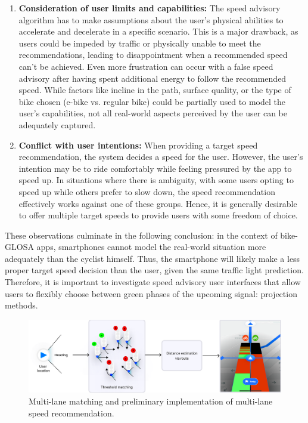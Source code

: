 \begin{enumerate}
\item \textbf{Consideration of user limits and capabilities:} The speed advisory algorithm has to make assumptions about the user's physical abilities to accelerate and decelerate in a specific scenario. This is a major drawback, as users could be impeded by traffic or physically unable to meet the recommendations, leading to disappointment when a recommended speed can't be achieved. Even more frustration can occur with a false speed advisory after having spent additional energy to follow the recommended speed. While factors like incline in the path, surface quality, or the type of bike chosen (e-bike vs. regular bike) could be partially used to model the user's capabilities, not all real-world aspects perceived by the user can be adequately captured.
\item \textbf{Conflict with user intentions:} When providing a target speed recommendation, the system decides a speed for the user. However, the user's intention may be to ride comfortably while feeling pressured by the app to speed up. In situations where there is ambiguity, with some users opting to speed up while others prefer to slow down, the speed recommendation effectively works against one of these groups. Hence, it is generally desirable to offer multiple target speeds to provide users with some freedom of choice.
\end{enumerate}
 
These observations culminate in the following conclusion: in the context of bike-GLOSA apps, smartphones cannot model the real-world situation more adequately than the cyclist himself. Thus, the smartphone will likely make a less proper target speed decision than the user, given the same traffic light prediction. Therefore, it is important to investigate speed advisory user interfaces that allow users to flexibly choose between green phases of the upcoming signal: projection methods.

\begin{figure}[htbp]
\centering
\includegraphics[width=\linewidth]{images/multi-lane-view.png}
\caption{Multi-lane matching and preliminary implementation of multi-lane speed recommendation.}
\label{fig:multi-lane-view}
\end{figure}

